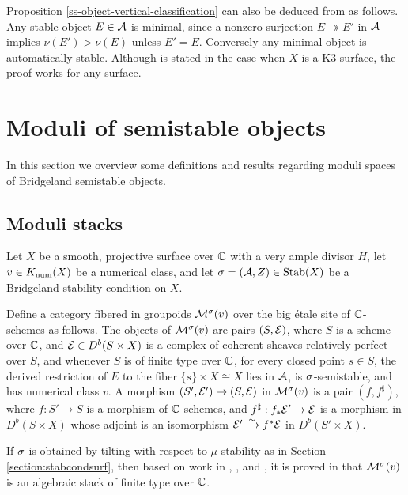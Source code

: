 \begin{rmk}
Proposition \ref{ss-object-vertical-classification} can also be deduced from \cite[Proposition 2.2]{huy} as follows. Any stable object $E \in \mathcal{A}$ is minimal, since a nonzero surjection $E \twoheadrightarrow E'$ in $\mathcal{A}$ implies $\nu(E') > \nu(E)$ unless $E' = E$. Conversely any minimal object is automatically stable. Although \cite[Proposition 2.2]{huy} is stated in the case when $X$ is a K3 surface, the proof works for any surface.
\end{rmk}


\section{Moduli of semistable objects}
In this section we overview some definitions and results regarding moduli spaces of Bridgeland semistable objects. 

\subsection{Moduli stacks}
Let $X$ be a smooth, projective surface over $\mathbb{C}$ with a very ample divisor $H$, let $v \in K_{\mathrm{num}}(X)$ be a numerical class, and let $\sigma = (\mathcal{A}, Z) \in \operatorname{\mathrm{Stab}}(X)$ be a Bridgeland stability condition on $X$.

Define a category fibered in groupoids $\mathcal{M}^\sigma(v)$ over the big \'etale site of $\mathbb{C}$-schemes as follows. The objects of $\mathcal{M}^\sigma(v)$ are pairs $(S, \mathcal{E})$, where $S$ is a scheme over $\mathbb{C}$, and $\mathcal{E} \in D^b(S \times X)$ is a complex of coherent sheaves relatively perfect over $S$, and whenever $S$ is of finite type over $\mathbb{C}$, for every closed point $s \in S$, the derived restriction of $E$ to the fiber $\{s\} \times X \cong X$ lies in $\mathcal{A}$, is $\sigma$-semistable, and has numerical class $v$. A morphism $(S', \mathcal{E}') \to (S, \mathcal{E})$ in $\mathcal{M}^\sigma(v)$ is a pair $(f, f^\sharp)$, where $f: S' \to S$ is a morphism of $\mathbb{C}$-schemes, and $f^\sharp: f_* \mathcal{E}' \to \mathcal{E}$ is a morphism in $D^b(S \times X)$ whose adjoint is an isomorphism $\mathcal{E}' \xrightarrow{\sim} f^* \mathcal{E}$ in $D^b(S' \times X)$.

If $\sigma$ is obtained by tilting with respect to $\mu$-stability as in Section \ref{section:stabcondsurf}, then based on work in \cite{lie06}, \cite{ABL13}, and \cite{AP06}, it is proved in \cite{toda08} that $\mathcal{M}^\sigma(v)$ is an algebraic stack of finite type over $\mathbb{C}$. 

